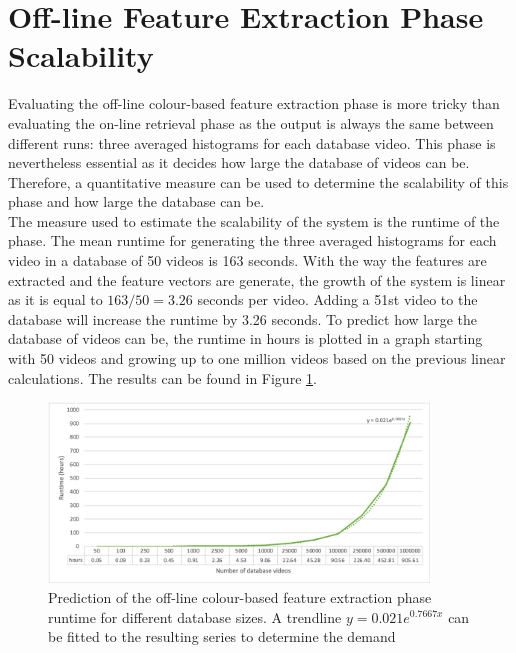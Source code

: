 \section{Off-line Feature Extraction Phase Scalability}

Evaluating the off-line colour-based feature extraction phase is more tricky than evaluating the on-line retrieval phase as the output is always the same between different runs: three averaged histograms for each database video. This phase is nevertheless essential as it decides how large the database of videos can be. Therefore, a quantitative measure can be used to determine the scalability of this phase and how large the database can be.\\

The measure used to estimate the scalability of the system is the runtime of the phase. The mean runtime for generating the three averaged histograms for each video in a database of 50 videos is 163 seconds. With the way the features are extracted and the feature vectors are generate, the growth of the system is linear as it is equal to $163/50=3.26$ seconds per video. Adding a 51st video to the database will increase the runtime by 3.26 seconds. To predict how large the database of videos can be, the runtime in hours is plotted in a graph starting with 50 videos and growing up to one million videos based on the previous linear calculations. The results can be found in Figure \ref{fig:evaluation-offline_phase_runtime_trendline}.

\begin{figure}[h]
\centerline{\includegraphics[width=0.9\textwidth]{figures/evaluation/offline_phase_runtime_trendline.png}}
\caption{\label{fig:evaluation-offline_phase_runtime_trendline}Prediction of the off-line colour-based feature extraction phase runtime for different database sizes. A trendline $y=0.021e^{0.7667x}$ can be fitted to the resulting series to determine the demand }
\end{figure}


